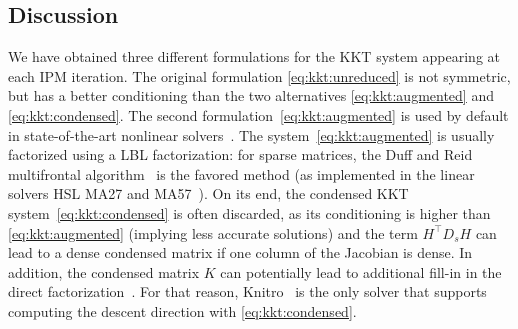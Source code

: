 \subsection{Discussion}
We have obtained three different formulations for the KKT system
appearing at each IPM iteration.
The original formulation \eqref{eq:kkt:unreduced} is not symmetric, but
has a better conditioning than the two alternatives \eqref{eq:kkt:augmented}
and \eqref{eq:kkt:condensed}.
The second formulation~\eqref{eq:kkt:augmented} is
used by default in state-of-the-art nonlinear solvers~\cite{wachter2006implementation,waltz2006interior}.
The system~\eqref{eq:kkt:augmented} is usually factorized using a LBL factorization: for sparse matrices, the Duff and Reid
multifrontal algorithm~\cite{duff1983multifrontal} is the favored method (as implemented in the linear solvers HSL
MA27 and MA57~\cite{duff2004ma57}).
On its end, the condensed KKT system~\eqref{eq:kkt:condensed} is often discarded,
as its conditioning is higher
than \eqref{eq:kkt:augmented} (implying less accurate solutions)
and the term $H^\top D_s H$ can lead to a dense condensed matrix if one column
of the Jacobian is dense. In addition,
the condensed matrix $K$ can potentially lead to additional fill-in
in the direct factorization~\cite[Section 19.3, p.571]{nocedal_numerical_2006}.
For that reason, Knitro~\cite{waltz2006interior} is the only solver
that supports computing the descent direction with \eqref{eq:kkt:condensed}.


